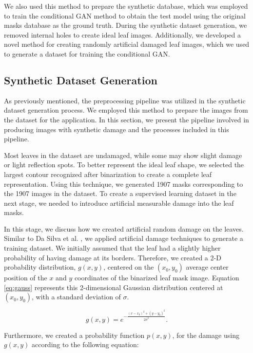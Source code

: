 We also used this method to prepare the synthetic database, which was employed to train the conditional GAN method to obtain the test model using the original masks database as the ground truth. During the synthetic dataset generation, we removed internal holes to create ideal leaf images. Additionally, we developed a novel method for creating randomly artificial damaged leaf images, which we used to generate a dataset for training the conditional GAN.

\subsection{Synthetic Dataset Generation}

As previously mentioned, the preprocessing pipeline was utilized in the synthetic dataset generation process. We employed this method to prepare the images from the dataset for the application. In this section, we present the pipeline involved in producing images with synthetic damage and the processes included in this pipeline.

Most leaves in the dataset are undamaged, while some may show slight damage or light reflection spots. To better represent the ideal leaf shape, we selected the largest contour recognized after binarization to create a complete leaf representation. Using this technique, we generated 1907 masks corresponding to the 1907 images in the dataset. To create a supervised learning dataset in the next stage, we needed to introduce artificial measurable damage into the leaf masks.

In this stage, we discuss how we created artificial random damage on the leaves. Similar to Da Silva et al. \cite{da2019estimating}, we applied artificial damage techniques to generate a training dataset. We initially assumed that the leaf had a slightly higher probability of having damage at its borders. Therefore, we created a 2-D probability distribution, $g(x,y)$, centered on the $(x_0,y_0)$ average center position of the $x$ and $y$ coordinates of the binarized leaf mask image. Equation \ref{eq:gauss} represents this 2-dimensional Gaussian distribution centered at $(x_0,y_0)$, with a standard deviation of $\sigma$.

\begin{equation}
\label{eq:gauss}
    g(x,y) = e^{-\frac{(x-x_0)^2 + (y-y_0)^2}{2 \dot \sigma^2}}.
\end{equation}

Furthermore, we created a probability function $p(x,y)$, for the damage using $g(x,y)$ according to the following equation:

